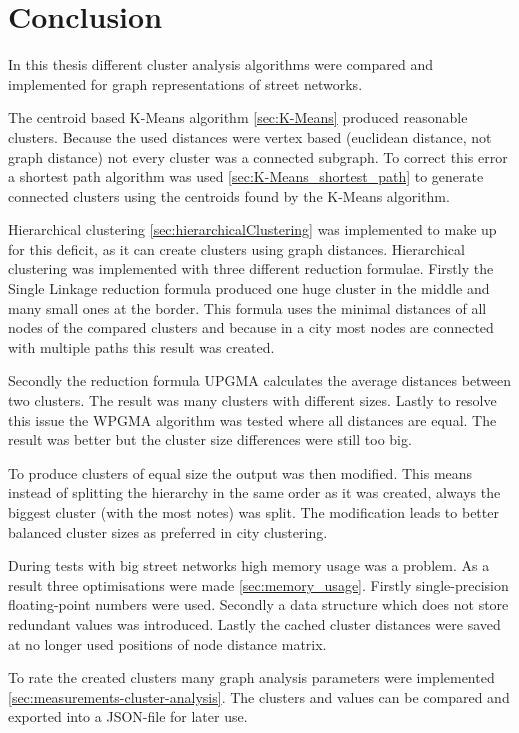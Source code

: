 \chapter{Conclusion}
In this thesis different cluster analysis algorithms were compared and implemented for graph representations of street networks.

The centroid based K-Means algorithm \ref{sec:K-Means} produced reasonable clusters. Because the used distances were vertex based (euclidean distance, not graph distance) not every cluster was a connected subgraph. To correct this error a shortest path algorithm was used \ref{sec:K-Means_shortest_path} to generate connected clusters using the centroids found by the K-Means algorithm.

Hierarchical clustering \ref{sec:hierarchicalClustering} was implemented to make up for this deficit, as it can create clusters using graph distances. Hierarchical clustering was implemented with three different reduction formulae. Firstly the Single Linkage reduction formula produced one huge cluster in the middle and many small ones at the border. This formula uses the minimal distances of all nodes of the compared clusters and because in a city most nodes are connected with multiple paths this result was created.

Secondly the reduction formula \gls{UPGMA} calculates the average distances between two clusters. The result was many clusters with different sizes. Lastly to resolve this issue the \gls{WPGMA} algorithm was tested where all distances are equal. The result was better but the cluster size differences were still too big.

To produce clusters of equal size the output was then modified. This means instead of splitting the hierarchy in the same order as it was created, always the biggest cluster (with the most notes) was split. The modification leads to better balanced cluster sizes as preferred in city clustering.

During tests with big street networks high memory usage was a problem. As a result three optimisations were made \ref{sec:memory_usage}. Firstly single-precision floating-point numbers were used. Secondly a data structure which does not store redundant values was introduced. Lastly the cached cluster distances were saved at no longer used positions of node distance matrix.

To rate the created clusters many graph analysis parameters were implemented \ref{sec:measurements-cluster-analysis}. The clusters and values can be compared and exported into a JSON-file for later use.